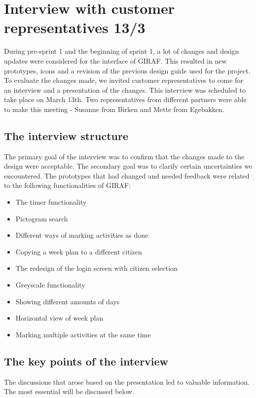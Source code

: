\section{Interview with customer representatives 13/3}\label{interview13-3}
During pre-sprint 1 and the beginning of sprint 1, a lot of changes and design updates were considered for the interface of GIRAF.
This resulted in new prototypes, icons and a revision of the previous design guide used for the project.
To evaluate the changes made, we invited customer representatives to come for an interview and a presentation of the changes.
This interview was scheduled to take place on March 13th.
Two representatives from different partners were able to make this meeting - Susanne from Birken and Mette from Egebakken.

\subsection{The interview structure}
The primary goal of the interview was to confirm that the changes made to the design were acceptable.
The secondary goal was to clarify certain uncertainties we encountered.
The prototypes that had changed and needed feedback were related to the following functionalities of GIRAF:
\begin{itemize}
    \item The timer functionality
    \item Pictogram search
    \item Different ways of marking activities as done
    \item Copying a week plan to a different citizen
    \item The redesign of the login screen with citizen selection
    \item Greyscale functionality
    \item Showing different amounts of days
    \item Horizontal view of week plan
    \item Marking multiple activities at the same time
\end{itemize}

\subsection{The key points of the interview}
The discussions that arose based on the presentation led to valuable information.
The most essential will be discussed below.

